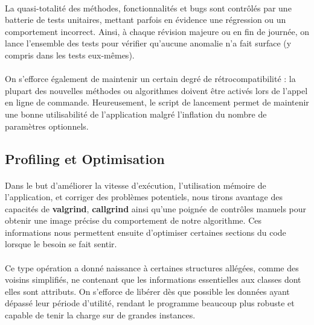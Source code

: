 \documentclass[a4paper,10pt]{report}
\begin{document}
\paragraph{}
  La quasi-totalité des méthodes, fonctionnalités et bugs sont contrôlés par
une batterie de tests unitaires, mettant parfois en évidence une régression ou
un comportement incorrect. Ainsi, à chaque révision majeure ou en fin de
journée, on lance l'ensemble des tests pour vérifier qu'aucune anomalie n'a fait
surface (y compris dans les tests eux-mêmes).

\paragraph{}
  On s'efforce également de maintenir un certain degré de rétrocompatibilité
: la plupart des nouvelles méthodes ou algorithmes doivent être activés lors de
l'appel en ligne de commande. Heureusement, le script de lancement permet de
maintenir une bonne utilisabilité de l'application malgré l'inflation du nombre
de paramètres optionnels.

\subsection{Profiling et Optimisation}
\paragraph{}
  Dans le but d'améliorer la vitesse d'exécution, l'utilisation mémoire de
l'application, et corriger des problèmes potentiels, nous tirons avantage des
capacités de \textbf{valgrind}, \textbf{callgrind} ainsi qu'une poignée de
contrôles manuels pour obtenir une image précise du comportement de notre
algorithme. Ces informations nous permettent ensuite d'optimiser certaines
sections du code lorsque le besoin se fait sentir.

\paragraph{}
  Ce type opération a donné naissance à certaines structures allégées, comme des
voisins simplifiés, ne contenant que les informations essentielles aux classes
dont elles sont attributs. On s'efforce de libérer dès que possible les données
ayant dépassé leur période d'utilité, rendant le programme beaucoup plus robuste
et capable de tenir la charge sur de grandes instances.
\end{document}
